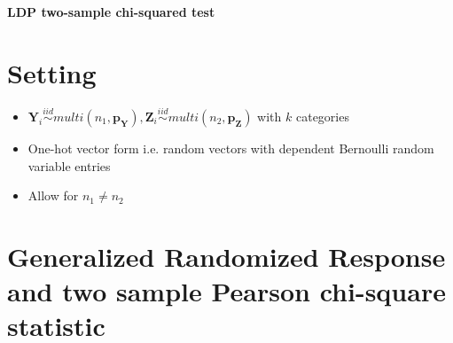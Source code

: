 \documentclass[11pt]{article} %
\newcommand{\vecBold}[1]{\boldsymbol{#1}} %
\newcommand{\sampleSize}{n}
\newcommand{\distparamMultinom}{\boldsymbol{p}}
\newcommand{\alphabetSize}{k}
\newcommand{\rvY}{Y}
\newcommand{\rVecY}{\vecBold{\rvY}}
\newcommand{\rvZ}{Z}
\newcommand{\rVecZ}{\vecBold{\rvZ}}
\begin{document}
\begin{center}
\LARGE \bf
LDP two-sample  chi-squared test
\end{center}

\begin{comment}
\begin{keyword}
\kwd{local differential privacy}
\kwd{two-sample testing}
\kwd{independence testing}
\kwd{minimax separation rates}
\end{keyword}

\end{comment}

\setcounter{tocdepth}{2}
\section{Setting}
\begin{itemize}
	\item $
\rVecY_i \stackrel{iid}{\sim}multi(\sampleSize_1, \distparamMultinom_{\rVecY}),
\rVecZ_i \stackrel{iid}{\sim}multi(\sampleSize_2, \distparamMultinom_{\rVecZ})$ with $\alphabetSize$ categories
	\item One-hot vector form i.e. random vectors with dependent Bernoulli random variable entries
	\item Allow for $n_1 \neq n_2$
	
\end{itemize}
\section{Generalized Randomized Response and two sample Pearson chi-square statistic}
\end{document}
